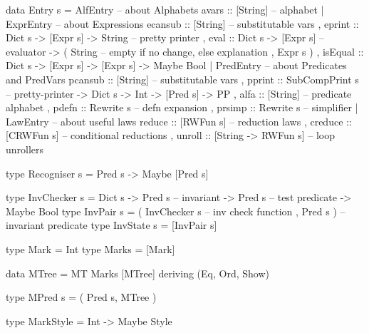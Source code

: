 \begin{code}
data Entry s =
   AlfEntry {   -- about Alphabets
    avars   :: [String]  -- alphabet
   }
 | ExprEntry { -- about Expressions
     ecansub :: [String]                   -- substitutable vars
   , eprint  :: Dict s -> [Expr s] -> String   -- pretty printer
   , eval    :: Dict s -> [Expr s]                  -- evaluator
             -> ( String -- empty if no change, else explanation
                , Expr s )
   , isEqual :: Dict s -> [Expr s] -> [Expr s] -> Maybe Bool
   }
 | PredEntry {    -- about Predicates and PredVars
     pcansub :: [String]                   -- substitutable vars
   , pprint  :: SubCompPrint s                 -- pretty-printer
             -> Dict s -> Int -> [Pred s]
             -> PP
   , alfa :: [String]                      -- predicate alphabet
   , pdefn   :: Rewrite s                      -- defn expansion
   , prsimp  :: Rewrite s                          -- simplifier
   }
 | LawEntry {  -- about useful laws
     reduce  :: [RWFun s]            -- reduction laws
   , creduce :: [CRWFun s]           -- conditional reductions
   , unroll  :: [String -> RWFun s]  -- loop unrollers
   }
\end{code}

\begin{code}
type Recogniser s = Pred s -> Maybe [Pred s]
\end{code}

\begin{code}
type InvChecker s
 = Dict s
   -> Pred s     -- invariant
   -> Pred s     -- test predicate
   -> Maybe Bool
type InvPair s
 = ( InvChecker s  -- inv check function
   , Pred s )      -- invariant predicate
type InvState s = [InvPair s]
\end{code}

\newpage
{}

\begin{code}
type Mark = Int
type Marks = [Mark]
\end{code}

\begin{code}
data MTree = MT Marks [MTree] deriving (Eq, Ord, Show)
\end{code}

\begin{code}
type MPred s = ( Pred s, MTree )
\end{code}

\begin{code}
type MarkStyle = Int -> Maybe Style
\end{code}

